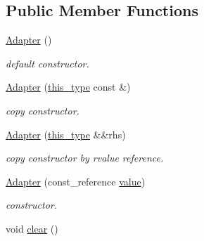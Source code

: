 \subsection*{Public Member Functions}
\begin{DoxyCompactItemize}
\item 
\hypertarget{classhryky_1_1_adapter_aad569390e8fc9963c8849cbd0c59bea9}{\hyperlink{classhryky_1_1_adapter_aad569390e8fc9963c8849cbd0c59bea9}{Adapter} ()}\label{classhryky_1_1_adapter_aad569390e8fc9963c8849cbd0c59bea9}

\begin{DoxyCompactList}\small\item\em default constructor. \end{DoxyCompactList}\item 
\hypertarget{classhryky_1_1_adapter_a97e07e29367512fa16eae5d11a0792b9}{\hyperlink{classhryky_1_1_adapter_a97e07e29367512fa16eae5d11a0792b9}{Adapter} (\hyperlink{classhryky_1_1_adapter_a30de4db4c91a113187fa2f0edbcb1b2a}{this\-\_\-type} const \&)}\label{classhryky_1_1_adapter_a97e07e29367512fa16eae5d11a0792b9}

\begin{DoxyCompactList}\small\item\em copy constructor. \end{DoxyCompactList}\item 
\hypertarget{classhryky_1_1_adapter_ae96aec043d63145d978b24539332ffe4}{\hyperlink{classhryky_1_1_adapter_ae96aec043d63145d978b24539332ffe4}{Adapter} (\hyperlink{classhryky_1_1_adapter_a30de4db4c91a113187fa2f0edbcb1b2a}{this\-\_\-type} \&\&rhs)}\label{classhryky_1_1_adapter_ae96aec043d63145d978b24539332ffe4}

\begin{DoxyCompactList}\small\item\em copy constructor by rvalue reference. \end{DoxyCompactList}\item 
\hypertarget{classhryky_1_1_adapter_ae2ef0abef88ed5d5b807b66af55a0b94}{\hyperlink{classhryky_1_1_adapter_ae2ef0abef88ed5d5b807b66af55a0b94}{Adapter} (const\-\_\-reference \hyperlink{classhryky_1_1_adapter_ab736ecd30f215ca3cbd2364f818cb83f}{value})}\label{classhryky_1_1_adapter_ae2ef0abef88ed5d5b807b66af55a0b94}

\begin{DoxyCompactList}\small\item\em constructor. \end{DoxyCompactList}\item 
\hypertarget{classhryky_1_1_adapter_adbdbd187b837f6782b776ca8aabd411b}{void \hyperlink{classhryky_1_1_adapter_adbdbd187b837f6782b776ca8aabd411b}{clear} ()}\label{classhryky_1_1_adapter_adbdbd187b837f6782b776ca8aabd411b}


\end{DoxyCompactItemize}
